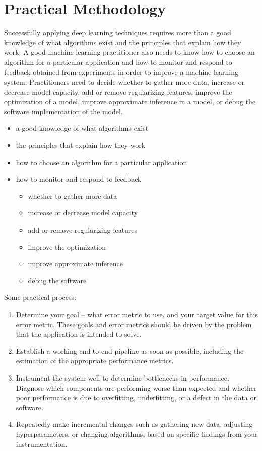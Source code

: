 
\chapter{Practical Methodology}

Successfully applying deep learning techniques requires more than a good knowledge of what algorithms exist and
the principles that explain how they work.
A good machine learning practitioner also needs to know how to choose an algorithm for a particular application and
how to monitor and respond to feedback obtained from experiments in order to improve a machine learning system.
Practitioners need to decide whether to gather more data,
increase or decrease model capacity,
add or remove regularizing features,
improve the optimization of a model,
improve approximate inference in a model,
or debug the software implementation of the model.


\begin{tcolorbox}
  \begin{itemize}
  \item a good knowledge of what algorithms exist
  \item the principles that explain how they work
  \item how to choose an algorithm for a particular application
  \item how to monitor and respond to feedback
    \begin{itemize}
    \item whether to gather more data
    \item increase or decrease model capacity
    \item add or remove regularizing features
    \item improve the optimization 
    \item improve approximate inference
    \item debug the software
    \end{itemize}
  \end{itemize}
\end{tcolorbox}


Some practical process:
\begin{enumerate}
\item Determine your goal -- what error metric to use, and your target value for this error metric.
  These goals and error metrics should be driven by the problem that the application is intended to solve.
\item Establish a working end-to-end pipeline as soon as possible, including the estimation of the appropriate performance metrics.
\item Instrument the system well to determine bottlenecks in performance.
  Diagnose which components are performing worse than expected and whether poor performance is due to overfitting, underfitting, or a defect in the data or software.
\item Repeatedly make incremental changes such as gathering new data, adjusting hyperparameters, or changing algorithms, based on specific findings from your instrumentation.
\end{enumerate}

